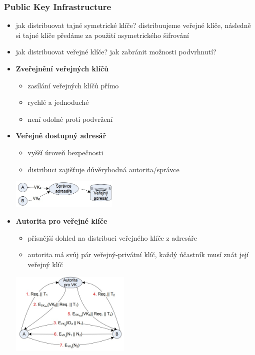 \subsubsection*{Public Key Infrastructure}
\begin{itemize}
	\item jak distribuovat tajné symetrické klíče? distribuujeme veřejné klíče, následně si tajné klíče předáme za použití asymetrického šifrování
	\item jak distribuovat veřejné klíče? jak zabránit možnosti podvrhnutí?
	\item \textbf{Zveřejnění veřejných klíčů}
	\begin{itemize}
		\item zasílání veřejných klíčů přímo
		\item rychlé a jednoduché
		\item není odolné proti podvržení
	\end{itemize}
	\item \textbf{Veřejně dostupný adresář}
	\begin{itemize}
		\item vyšší úroveň bezpečnosti
		\item distribuci zajišťuje důvěryhodná autorita/správce
	\end{itemize}
	
	\includegraphics[width=0.4\textwidth]{img/SP-9_2.jpg}
	
	\item \textbf{Autorita pro veřejné klíče}
	\begin{itemize}
		\item přísnější dohled na distribuci veřejného klíče z adresáře
		\item autorita má svůj pár veřejný-privátní klíč, každý účastník musí znát její veřejný klíč
	\end{itemize}
	
	\includegraphics[width=0.45\textwidth]{img/SP-9_3.jpg}
	

\end{itemize}
